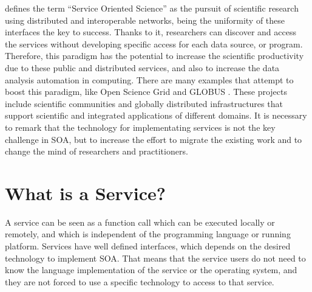  \cite{Foster2005Science} defines the term ``Service Oriented
Science'' as the pursuit of scientific research using distributed and
interoperable networks, being the uniformity of
these interfaces the key to success. Thanks to it, researchers can discover and access
the services without developing specific access for each data source, or
program. %
Therefore, this paradigm has the potential to increase the
scientific productivity due to these public and distributed services,
and also to increase the data analysis automation in computing. There
are many examples that attempt to boost this paradigm, like Open
Science Grid \citep{Altunay2011OpenScience} and GLOBUS
\citep{Foster2005Globus}.  %
These projects include scientific communities and globally distributed infrastructures that support scientific and integrated applications of different domains.
It is necessary to remark that the technology for implementating services is not the
key challenge in SOA, but to increase the effort to migrate the
existing work and to change the mind of researchers and
practitioners. %

\section{What is a Service?}

\lettrine{A}{} service can be seen as a function call which can be
executed locally or remotely, and which is independent of the
programming language or running platform. Services have well defined
interfaces, which depends on the desired technology to implement
SOA. That means that the service users do not need to know the
language implementation of the service or the operating system, %
 and they are not forced to use a specific technology to access to that service.

